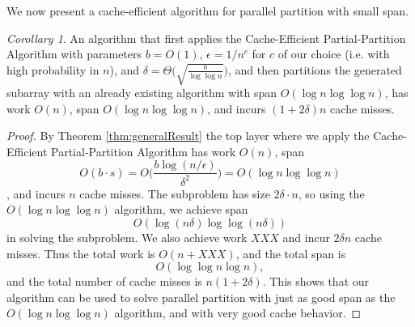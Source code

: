 \documentclass[sigconf]{acmart}
\theoremstyle{remark}
\newtheorem{corollary}[thm]{Corollary}
\theoremstyle{remark}
\begin{document}
We now present a cache-efficient algorithm for parallel partition with small span.
\begin{corollary}
	An algorithm that first applies the Cache-Efficient Partial-Partition Algorithm with parameters $b=O(1)$, $\epsilon = 1/n^c$ for $c$ of our choice (i.e. with high probability in $n$), and $\delta = \Theta\Big(\sqrt{\frac{b}{\log\log n}}\Big)$, and then partitions the generated subarray with an already existing algorithm with span $O(\log n \log\log n)$, has work $O(n)$, span $O(\log n \log\log n)$, and incurs $(1+2\delta)n$ cache misses.
\end{corollary}
\begin{proof}
	By Theorem \ref{thm:generalResult} the top layer where we apply the Cache-Efficient Partial-Partition Algorithm has work $O(n)$, span $$O(b\cdot s) = O\Big(\frac{b\log(n/\epsilon)}{\delta^2}\Big)=O(\log n \log\log n)$$, and incurs $n$ cache misses.
	The subproblem has size $2\delta\cdot n$, so using the $O(\log n \log\log n)$ algorithm, we achieve span
	$$O(\log(n\delta)\log\log(n\delta))$$
	in solving the subproblem.
	We also achieve work $XXX$ and incur $2\delta n$ cache misses. %
	Thus the total work is $O(n+XXX)$, and the total span is $$O(\log\log n \log n),$$
	and the total number of cache misses is $n(1+2\delta)$. %
	This shows that our algorithm can be used to solve parallel partition with just as good span as the $O(\log n \log\log n)$ algorithm, and with very good cache behavior.
\end{proof}
\end{document}
